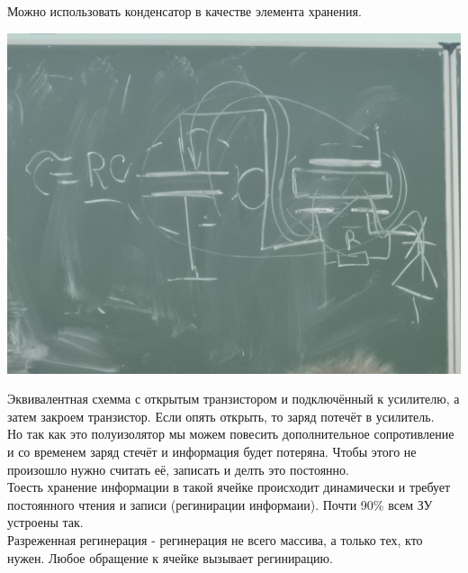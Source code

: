 \documentclass[12px]{article}
\begin{document}
Можно использовать конденсатор в качестве элемента хранения.
\begin{center}
	\includegraphics[width=0.7\linewidth]{images/Кондей и полевой транзистор.jpg}
\end{center}
Эквивалентная схемма с открытым транзистором и подключённый к усилителю, а затем закроем транзистор. Если опять открыть, то заряд потечёт в усилитель.\\
Но так как это полуизолятор мы можем повесить дополнительное сопротивление и со временем заряд стечёт и информация будет потеряна. Чтобы этого не произошло нужно считать её, записать и делть это постоянно. \\
Тоесть хранение информации в такой ячейке происходит динамически и требует постоянного чтения и записи (регинирации информаии). 
Почти 90\% всем ЗУ устроены так. \\
Разреженная регинерация - регинерация не всего массива, а только тех, кто нужен. Любое обращение к ячейке вызывает регинирацию.
\end{document}

